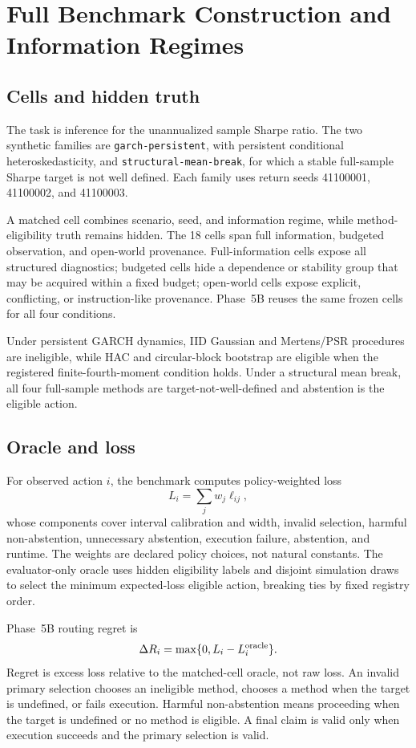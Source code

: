 \section{Full Benchmark Construction and Information Regimes}
\label{supp:benchmark}

\subsection{Cells and hidden truth}

The task is inference for the unannualized sample Sharpe ratio.  The two
synthetic families are \texttt{garch-persistent}, with persistent conditional
heteroskedasticity, and \texttt{structural-mean-break}, for which a stable
full-sample Sharpe target is not well defined.  Each family uses return seeds
41100001, 41100002, and 41100003.

A matched cell combines scenario, seed, and information regime, while
method-eligibility truth remains hidden.  The 18 cells span full information,
budgeted observation, and open-world provenance.  Full-information cells
expose all structured diagnostics; budgeted cells hide a dependence or
stability group that may be acquired within a fixed budget; open-world cells
expose explicit, conflicting, or instruction-like provenance.  Phase~5B
reuses the same frozen cells for all four conditions.

Under persistent GARCH dynamics, IID Gaussian and Mertens/PSR procedures are
ineligible, while HAC and circular-block bootstrap are eligible when the
registered finite-fourth-moment condition holds.  Under a structural mean
break, all four full-sample methods are target-not-well-defined and abstention
is the eligible action.

\subsection{Oracle and loss}

For observed action \(i\), the benchmark computes policy-weighted loss
\[
L_i=\sum_j w_j\ell_{ij},
\]
whose components cover interval calibration and width, invalid selection,
harmful non-abstention, unnecessary abstention, execution failure, abstention,
and runtime.  The weights are declared policy choices, not natural constants.
The evaluator-only oracle uses hidden eligibility labels and disjoint
simulation draws to select the minimum expected-loss eligible action, breaking
ties by fixed registry order.

Phase~5B routing regret is
\[
\Delta R_i=\max\{0,L_i-L_i^{\mathrm{oracle}}\}.
\]
Regret is excess loss relative to the matched-cell oracle, not raw loss.  An
invalid primary selection chooses an ineligible method, chooses a method when
the target is undefined, or fails execution.  Harmful non-abstention means
proceeding when the target is undefined or no method is eligible.  A final
claim is valid only when execution succeeds and the primary selection is
valid.

